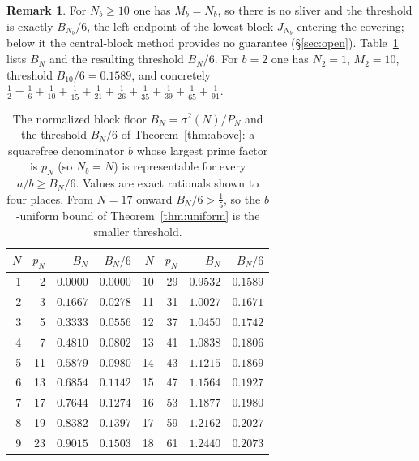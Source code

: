 \documentclass[11pt]{amsart}
\theoremstyle{plain}
\theoremstyle{definition}
\newtheorem{remark}[theorem]{Remark}
\begin{document}
\begin{remark}
For $N_b\ge 10$ one has $M_b=N_b$, so there is no sliver and the threshold is
exactly $B_{N_b}/6$, the left endpoint of the lowest block $J_{N_b}$ entering the
covering; below it the central-block method provides no guarantee
(\S\ref{sec:open}).  Table~\ref{tab:BN} lists $B_N$ and the resulting threshold
$B_N/6$.  For $b=2$ one has $N_2=1$, $M_2=10$, threshold
$B_{10}/6=0.1589$, and concretely
$\tfrac12=\tfrac16+\tfrac1{10}+\tfrac1{15}+\tfrac1{21}+\tfrac1{26}+\tfrac1{35}
+\tfrac1{39}+\tfrac1{65}+\tfrac1{91}$.
\end{remark}

\begin{table}[t]
\centering
\begin{tabular}{rrrr@{\qquad}rrrr}
\toprule
$N$ & $p_N$ & $B_N$ & $B_N/6$ & $N$ & $p_N$ & $B_N$ & $B_N/6$\\
\midrule
 1 &  2 & $0.0000$ & $0.0000$ & 10 & 29 & $0.9532$ & $0.1589$\\
 2 &  3 & $0.1667$ & $0.0278$ & 11 & 31 & $1.0027$ & $0.1671$\\
 3 &  5 & $0.3333$ & $0.0556$ & 12 & 37 & $1.0450$ & $0.1742$\\
 4 &  7 & $0.4810$ & $0.0802$ & 13 & 41 & $1.0838$ & $0.1806$\\
 5 & 11 & $0.5879$ & $0.0980$ & 14 & 43 & $1.1215$ & $0.1869$\\
 6 & 13 & $0.6854$ & $0.1142$ & 15 & 47 & $1.1564$ & $0.1927$\\
 7 & 17 & $0.7644$ & $0.1274$ & 16 & 53 & $1.1877$ & $0.1980$\\
 8 & 19 & $0.8382$ & $0.1397$ & 17 & 59 & $1.2162$ & $0.2027$\\
 9 & 23 & $0.9015$ & $0.1503$ & 18 & 61 & $1.2440$ & $0.2073$\\
\bottomrule
\end{tabular}
\caption{The normalized block floor $B_N=\sigma^2(N)/P_N$ and the threshold
$B_N/6$ of Theorem~\ref{thm:above}: a squarefree denominator $b$ whose largest
prime factor is $p_N$ (so $N_b=N$) is representable for every $a/b\ge B_N/6$.
Values are exact rationals shown to four places.  From $N=17$ onward
$B_N/6>\tfrac15$, so the $b$-uniform bound of Theorem~\ref{thm:uniform} is the
smaller threshold.}
\label{tab:BN}
\end{table}
\end{document}
